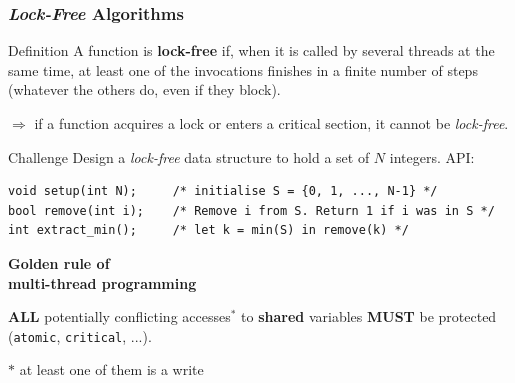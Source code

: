 \documentclass{beamer}
\begin{document}

\begin{frame}[label=lock-free-defs,fragile=singleslide]
  \frametitle{\emph{Lock-Free} Algorithms}

  \begin{block}{Definition}
    A function is \textbf{lock-free} if, when it is called by several threads at
    the same time, at least one of the invocations finishes in a finite number
    of steps (whatever the others do, even if they block).
  \end{block}
  
  \bigskip
  
  $\Rightarrow$ if a function acquires a lock or enters a critical section, it
  cannot be \emph{lock-free}.

  \bigskip

  \begin{alertblock}{Challenge}
    Design a \emph{lock-free} data structure to hold a set of $N$ integers. API:
\begin{verbatim}
void setup(int N);     /* initialise S = {0, 1, ..., N-1} */
bool remove(int i);    /* Remove i from S. Return 1 if i was in S */
int extract_min();     /* let k = min(S) in remove(k) */
\end{verbatim}
  \end{alertblock}
\end{frame}


\begin{frame}[label=golden_rule]
  \begin{center}
    \Huge \bf \alert{Golden rule of \\ multi-thread programming }
  \end{center}

  \bigskip
  
  {\Large \textbf{ALL} potentially conflicting accesses${}^*$
    to \textbf{shared} variables \alert{\textbf{MUST}} be protected (\texttt{atomic},
    \texttt{critical}, ...).}

  \bigskip

  $*$ at least one of them is a write
\end{frame}

\end{document}
